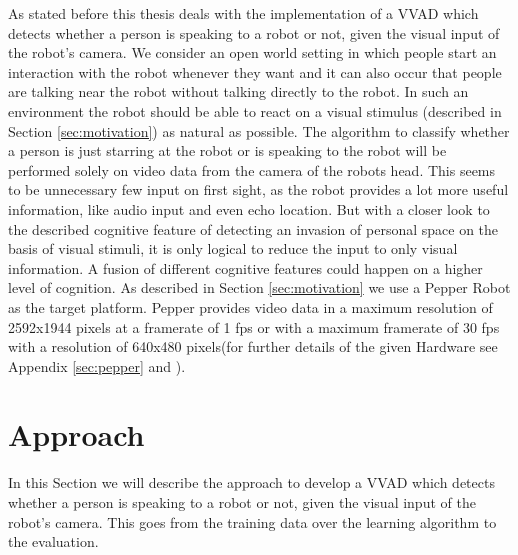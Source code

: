 As stated before this thesis deals with the implementation of a VVAD which detects whether a person is speaking to a robot or not, given the visual input of the robot's camera.
We consider an open world setting in which people start an interaction with the robot whenever they want and it can also occur that people are talking near the robot without talking directly to the robot.
In such an environment the robot should be able to react on a visual stimulus (described in Section \ref{sec:motivation}) as natural as possible.
The algorithm to classify whether a person is just starring at the robot or is speaking to the robot will be performed solely on video data from the camera of the robots head. This seems to be unnecessary few input on first sight, as the robot provides a lot more useful information, like audio input and even echo location. But with a closer look to the described cognitive feature of detecting an invasion of personal space on the basis of visual stimuli, it is only logical to reduce the input to only visual information. A fusion of different cognitive features could happen on a higher level of cognition.
As described in Section \ref{sec:motivation} we use a Pepper Robot as the target platform. Pepper provides video data in a maximum resolution of 2592x1944 pixels at a framerate of 1 fps or with a maximum framerate of 30 fps with a resolution of 640x480 pixels(for further details of the given Hardware see Appendix \ref{sec:pepper} and \cite{Pepper2018}).


\section{Approach}\label{sec:approach}
In this Section we will describe the approach to develop a VVAD which detects whether a person is speaking to a robot or not, given the visual input of the robot's camera. This goes from the training data over the learning algorithm to the evaluation.
